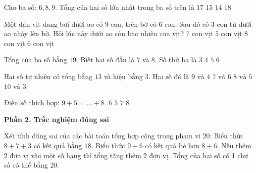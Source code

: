 \begin{ex} %
Cho ba số: $6, 8, 9$. Tổng của hai số lớn nhất trong ba số trên là
\choice
{\True $17$}
{$15$}
{$14$}
{$18$}
\end{ex}

\begin{ex} %
Một đàn vịt đang bơi dưới ao có $9$ con, trên bờ có $6$ con. Sau đó có $3$ con từ dưới ao nhảy lên bờ. Hỏi lúc này dưới ao còn bao nhiêu con vịt?
\choice
{$7$ con vịt}
{$5$ con vịt}
{$8$ con vịt}
{\True $6$ con vịt}
\end{ex}

\begin{ex} %
Tổng của ba số bằng $19$. Biết hai số đầu là $7$ và $8$. Số thứ ba là
\choice
{$3$}
{\True $4$}
{$5$}
{$6$}
\end{ex}

\begin{ex} %
Hai số tự nhiên có tổng bằng $13$ và hiệu bằng $3$. Hai số đó là
\choice
{$9\text{ và } 4$}
{$7\text{ và } 6$}
{\True $8\text{ và } 5$}
{$10\text{ và } 3$}
\end{ex}

\begin{ex} %
Điền số thích hợp: $9 + 5 = \dots + 8$.
\choice
{\True $6$}
{$5$}
{$7$}
{$8$}
\end{ex}

\textbf{Phần 2. Trắc nghiệm đúng sai}

\begin{ex} %
Xét tính đúng sai của các bài toán tổng hợp cộng trong phạm vi 20:
\choiceTF
{\True Biểu thức $8 + 7 + 3$ có kết quả bằng $18$.}
{Biểu thức $9 + 6$ có kết quả bé hơn $8 + 6$.}
{\True Nếu thêm 2 đơn vị vào một số hạng thì tổng tăng thêm 2 đơn vị.}
{Tổng của hai số có 1 chữ số có thể bằng 20.}
\end{ex}


